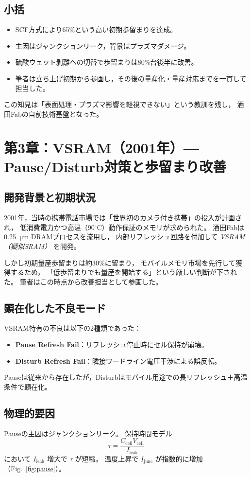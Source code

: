 \documentclass[conference]{IEEEtran}
\let\meter\metre
\begin{document}
\subsection{小括}
\begin{itemize}
  \item SCF方式により65\%という高い初期歩留まりを達成。
  \item 主因はジャンクションリーク，背景はプラズマダメージ。
  \item 硫酸ウェット剥離への切替で歩留まりは80\%台後半に改善。
  \item 筆者は立ち上げ初期から参画し，その後の量産化・量産対応までを一貫して担当した。
\end{itemize}
この知見は「表面処理・プラズマ影響を軽視できない」という教訓を残し，
酒田Fabの自前技術基盤となった。

\section{第3章：VSRAM（2001年）— Pause/Disturb対策と歩留まり改善}

\subsection{開発背景と初期状況}
2001年，当時の携帯電話市場では「世界初のカメラ付き携帯」の投入が計画され，
低消費電力かつ高温（90$^\circ$C）動作保証のメモリが求められた。
酒田Fabは \SI{0.25}{\micro\meter} DRAMプロセスを流用し，
内部リフレッシュ回路を付加して \emph{VSRAM（疑似SRAM）} を開発。

しかし初期量産歩留まりは約30\%に留まり，  
モバイルメモリ市場を先行して獲得するため，  
「低歩留まりでも量産を開始する」という厳しい判断が下された。  
筆者はこの時点から改善担当として参画した。

\subsection{顕在化した不良モード}
VSRAM特有の不良は以下の2種類であった：
\begin{itemize}
  \item \textbf{Pause Refresh Fail}：リフレッシュ停止時にセル保持が崩壊。
  \item \textbf{Disturb Refresh Fail}：隣接ワードライン電圧干渉による誤反転。
\end{itemize}

Pauseは従来から存在したが，Disturbはモバイル用途での長リフレッシュ＋高温条件で顕在化。

\subsection{物理的要因}
Pauseの主因はジャンクションリーク。
保持時間モデル
\[
\tau = \frac{C_{\mathrm{cell}} V_{\mathrm{cell}}}{I_{\mathrm{leak}}}
\]
において $I_{\mathrm{leak}}$ 増大で $\tau$ が短縮。
温度上昇で $I_{\mathrm{junc}}$ が指数的に増加（Fig.~\ref{fig:pause}）。
\end{document}
